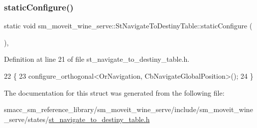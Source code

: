 \subsubsection{\texorpdfstring{static\+Configure()}{staticConfigure()}}
{\footnotesize\ttfamily static void sm\+\_\+moveit\+\_\+wine\+\_\+serve\+::\+St\+Navigate\+To\+Destiny\+Table\+::static\+Configure (\begin{DoxyParamCaption}{ }\end{DoxyParamCaption})\hspace{0.3cm}{\ttfamily [inline]}, {\ttfamily [static]}}



Definition at line 21 of file st\+\_\+navigate\+\_\+to\+\_\+destiny\+\_\+table.\+h.


\begin{DoxyCode}
22         \{
23             configure\_orthogonal<OrNavigation, CbNavigateGlobalPosition>();
24         \}
\end{DoxyCode}


The documentation for this struct was generated from the following file\+:\begin{DoxyCompactItemize}
\item 
smacc\+\_\+sm\+\_\+reference\+\_\+library/sm\+\_\+moveit\+\_\+wine\+\_\+serve/include/sm\+\_\+moveit\+\_\+wine\+\_\+serve/states/\hyperlink{sm__moveit__wine__serve_2include_2sm__moveit__wine__serve_2states_2st__navigate__to__destiny__table_8h}{st\+\_\+navigate\+\_\+to\+\_\+destiny\+\_\+table.\+h}\end{DoxyCompactItemize}
